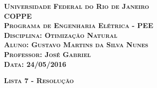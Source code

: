 \begin{titlepage}
\begin{flushleft}

\textsc{\textbf{\LARGE Universidade Federal do Rio de Janeiro}}\\[0.5cm]
\textsc{\textbf{\LARGE COPPE}}\\[0.5cm]
\textsc{\textbf{\LARGE Programa de Engenharia Elétrica - PEE}}\\[0.5cm]
\textsc{\textbf{\LARGE Disciplina: Otimização Natural}}\\[0.5cm]
\textsc{\textbf{\LARGE Aluno: Gustavo Martins da Silva Nunes}}\\[0.5cm]
\textsc{\textbf{\LARGE Professor: José Gabriel}}\\[0.5cm]
\textsc{\textbf{\LARGE Data: 24/05/2016}}\\[6.5cm]

\end{flushleft}
\begin{center}
\textsc{\textbf{\huge Lista 7 - Resolução}}
\vfill
\end{center}
\end{titlepage}